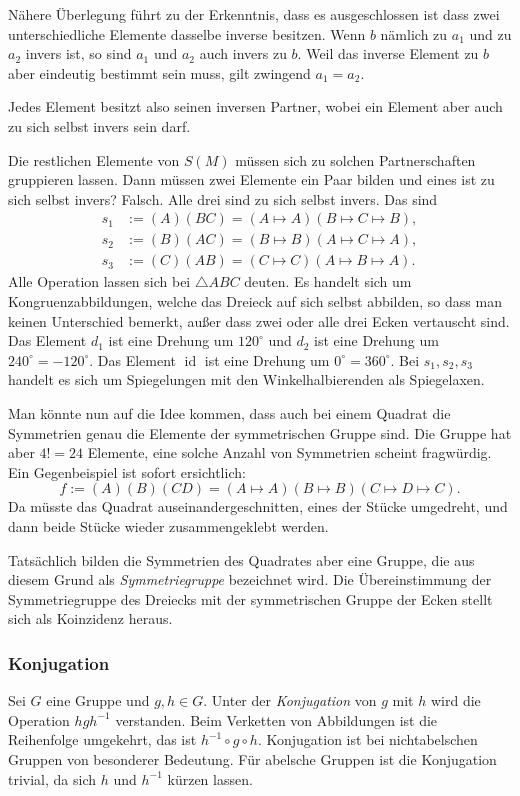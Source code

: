 \documentclass[a4paper,11pt,fleqn,twoside]{scrartcl}
\numberwithin{equation}{section}
\newcommand{\id}{\operatorname{id}}
\theoremstyle{rmbox}
\newcommand{\emdef}[1]{\emph{#1}}
\begin{document}
Nähere Überlegung führt zu der Erkenntnis, dass es ausgeschlossen
ist dass zwei unterschiedliche Elemente dasselbe inverse besitzen.
Wenn $b$ nämlich
zu $a_1$ und zu $a_2$ invers ist, so sind $a_1$ und $a_2$ auch invers
zu $b$. Weil das inverse Element zu $b$ aber eindeutig bestimmt sein
muss, gilt zwingend $a_1=a_2$.

Jedes Element besitzt also seinen inversen Partner,
wobei ein Element aber auch zu sich selbst invers sein darf.

Die restlichen Elemente von $S(M)$ müssen sich zu solchen
Partnerschaften gruppieren lassen. Dann müssen zwei Elemente
ein Paar bilden und eines ist zu sich selbst invers? Falsch.
Alle drei sind zu sich selbst invers. Das sind
\begin{align}\label{eq:Spiegelung1}
s_1&:= (A)(BC) = (A\mapsto A)(B\mapsto C\mapsto B),\\
s_2&:= (B)(AC) = (B\mapsto B)(A\mapsto C\mapsto A),\\
s_3&:= (C)(AB) = (C\mapsto C)(A\mapsto B\mapsto A).
\end{align}
Alle Operation lassen sich bei $\triangle ABC$ deuten.
Es handelt sich um Kongruenzabbildungen, welche das Dreieck
auf sich selbst abbilden, so dass man keinen Unterschied
bemerkt, außer dass zwei oder alle drei Ecken vertauscht sind.
Das Element $d_1$ ist eine Drehung um $120^\circ$ und $d_2$ ist
eine Drehung um $240^\circ = -120^\circ$. Das Element $\id$
ist eine Drehung um $0^\circ = 360^\circ$. Bei $s_1,s_2,s_3$
handelt es sich um Spiegelungen mit den Winkelhalbierenden
als Spiegelaxen.

Man könnte nun auf die Idee kommen, dass auch bei einem Quadrat
die Symmetrien genau die Elemente der symmetrischen Gruppe sind.
Die Gruppe hat aber $4!=24$ Elemente, eine solche Anzahl von
Symmetrien scheint fragwürdig. Ein Gegenbeispiel ist sofort
ersichtlich:
\begin{equation}
f := (A)(B)(CD) = (A\mapsto A)(B\mapsto B)(C\mapsto D\mapsto C).
\end{equation}
Da müsste das Quadrat auseinandergeschnitten, eines der Stücke
umgedreht, und dann beide Stücke wieder zusammengeklebt werden.

Tatsächlich bilden die Symmetrien des Quadrates aber eine Gruppe,
die aus diesem Grund als \emph{Symmetriegruppe} bezeichnet wird.
Die Übereinstimmung der Symmetriegruppe des Dreiecks mit der
symmetrischen Gruppe der Ecken stellt sich als Koinzidenz heraus.

\subsubsection{Konjugation}
Sei $G$ eine Gruppe und $g,h\in G$. Unter der \emdef{Konjugation}
von $g$ mit $h$ wird die Operation $hgh^{-1}$ verstanden. Beim
Verketten von Abbildungen ist die Reihenfolge umgekehrt, das ist
$h^{-1}\circ g\circ h$. Konjugation ist bei nichtabelschen Gruppen
von besonderer Bedeutung. Für abelsche Gruppen ist die Konjugation
trivial, da sich $h$ und $h^{-1}$ kürzen lassen.
\end{document}
